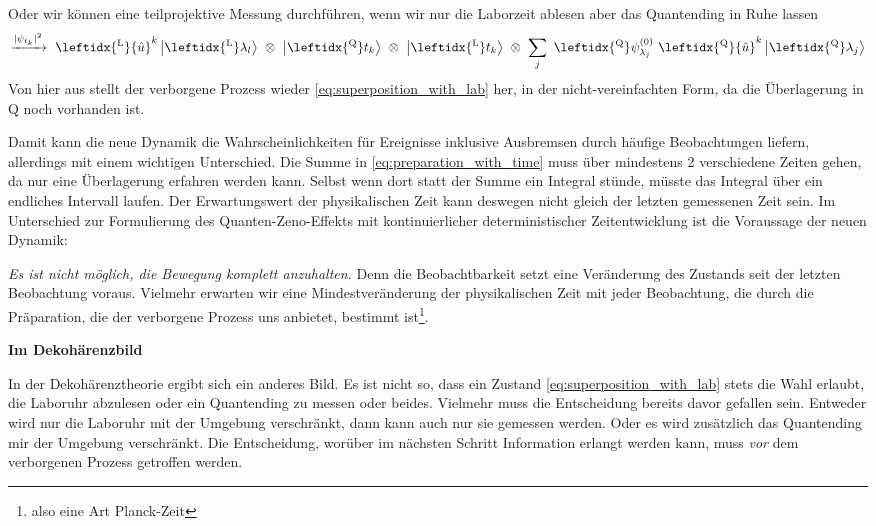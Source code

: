 \documentclass[12pt]{article}
\begin{document}
Oder wir können eine teilprojektive Messung durchführen, wenn wir nur die Laborzeit ablesen aber das Quantending in Ruhe lassen
\begin{equation}
\xrightarrow{|\psi_{t_k}|^2}\ 
\leftidx{^\mathrm{L}}{\hat{u}}^k \ket{ \leftidx{^\mathrm{L}}\lambda_l} 
\ \otimes\ \ket{\leftidx{^\mathrm{Q}}t_k}
\ \otimes\ \ket{\leftidx{^\mathrm{L}}t_k}
\ \otimes\ \sum_{j}\ \leftidx{^\mathrm{Q}}\psi_{\lambda_j}^{(0)}\ 
\leftidx{^\mathrm{Q}}{\hat{u}}^k
\ket{\leftidx{^\mathrm{Q}}\lambda_j} 
\end{equation}
Von hier aus stellt der verborgene Prozess wieder \eqref{eq:superposition_with_lab} her, in der nicht-vereinfachten Form, da die Überlagerung in Q noch vorhanden ist.

Damit kann die neue Dynamik die Wahrscheinlichkeiten für Ereignisse inklusive Ausbremsen durch häufige Beobachtungen liefern, allerdings mit einem wichtigen Unterschied. Die Summe in \eqref{eq:preparation_with_time} muss über mindestens 2 verschiedene Zeiten gehen, da nur eine Überlagerung erfahren werden kann. Selbst wenn dort statt der Summe ein Integral stünde, müsste das Integral über ein endliches Intervall laufen. Der Erwartungswert der physikalischen Zeit kann deswegen nicht gleich der letzten gemessenen Zeit sein. Im Unterschied zur Formulierung des Quanten-Zeno-Effekts mit kontinuierlicher deterministischer Zeitentwicklung ist die Voraussage der neuen Dynamik: 

\emph{Es ist nicht möglich, die Bewegung komplett anzuhalten.} Denn die Beobachtbarkeit setzt eine Veränderung des Zustands seit der letzten Beobachtung voraus. Vielmehr erwarten wir eine Mindestveränderung der physikalischen Zeit mit jeder Beobachtung, die durch die Präparation, die der verborgene Prozess uns anbietet, bestimmt ist\footnote{also eine Art Planck-Zeit}.

\textbf{Im Dekohärenzbild} 

In der Dekohärenztheorie ergibt sich ein anderes Bild. Es ist nicht so, dass ein Zustand \eqref{eq:superposition_with_lab} stets die Wahl erlaubt, die Laboruhr abzulesen oder ein Quantending zu messen oder beides. Vielmehr muss die Entscheidung bereits davor gefallen sein. Entweder wird nur die Laboruhr mit der Umgebung verschränkt, dann kann auch nur sie gemessen werden. Oder es wird zusätzlich das Quantending mir der Umgebung verschränkt. Die Entscheidung, worüber im nächsten Schritt Information erlangt werden kann, muss \emph{vor} dem verborgenen Prozess getroffen werden.
\end{document}
